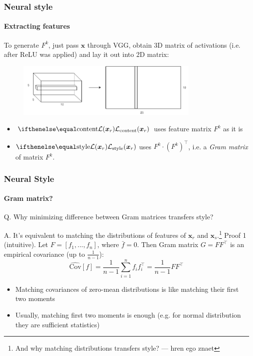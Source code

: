 \documentclass[10pt]{beamer}
\begin{document}
\begin{frame}
\frametitle{Neural style}
\framesubtitle{Extracting features}

To generate $F^k$, just pass $\bm x$ through VGG, obtain 3D matrix of activations (i.e. after ReLU was applied) and lay it out into 2D matrix:

\begin{figure}
    \centering
    \includegraphics[width=0.8\textwidth]{images/neural-style-feature-extraction}
\end{figure}


\begin{itemize}
    \item $\loss[\text{content}]{\bm x_r}$ uses feature matrix $F^k$ as it is
    \item $\loss[\text{style}]{\bm x_r}$ uses $F^k \cdot (F^k)^\top$, i.e. a \textit{Gram matrix} of matrix $F^k$.
\end{itemize}

\end{frame}


\begin{frame}
\frametitle{Neural Style}
\framesubtitle{Gram matrix?}
Q. Why minimizing difference between Gram matrices transfers style?

A. It's equivalent to matching the distributions of features of $\bm x_r$ and $\bm x_s$.\footnote{\tiny{And why matching distributions transfers style? --- hren ego znaet}}
\bigbreak
Proof 1 (intuitive). Let $F = [f_1, ..., f_n]$, where $\bar{f} = 0$. Then Gram matrix $G = FF^\top$ is an empirical covariance (up to $\frac{1}{n-1}$):
\[
\hat{\text{Cov}}[f] = \frac{1}{n-1}\sum_{i=1}^n f_if_i^\top = \frac{1}{n-1}FF^\top
\]

\begin{itemize}
    \item Matching covariances of zero-mean distributions is like matching their first two moments
    \item Usually, matching first two moments is enough (e.g. for normal distribution they are sufficient statistics)
\end{itemize}

\end{frame}
\end{document}
